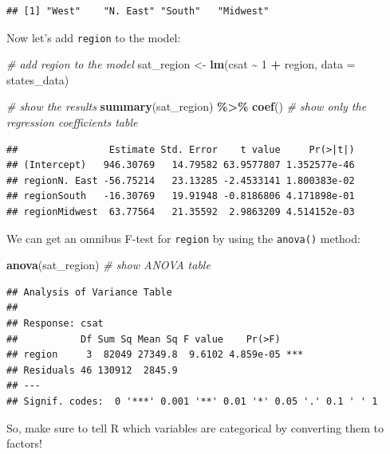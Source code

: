 \documentclass[
]{book}
\newenvironment{Shaded}{\begin{snugshade}}{\end{snugshade}}
\newcommand{\CommentTok}[1]{\textcolor[rgb]{0.56,0.35,0.01}{\textit{#1}}}
\newcommand{\DataTypeTok}[1]{\textcolor[rgb]{0.13,0.29,0.53}{#1}}
\newcommand{\DecValTok}[1]{\textcolor[rgb]{0.00,0.00,0.81}{#1}}
\newcommand{\KeywordTok}[1]{\textcolor[rgb]{0.13,0.29,0.53}{\textbf{#1}}}
\newcommand{\NormalTok}[1]{#1}
\newcommand{\OperatorTok}[1]{\textcolor[rgb]{0.81,0.36,0.00}{\textbf{#1}}}
\newcommand{\StringTok}[1]{\textcolor[rgb]{0.31,0.60,0.02}{#1}}
\begin{document}
\begin{verbatim}
## [1] "West"    "N. East" "South"   "Midwest"
\end{verbatim}

Now let's add \texttt{region} to the model:

\begin{Shaded}
\begin{Highlighting}[]
  \CommentTok{\# add region to the model}
\NormalTok{  sat\_region \textless{}{-}}\StringTok{ }\KeywordTok{lm}\NormalTok{(csat }\OperatorTok{\textasciitilde{}}\StringTok{ }\DecValTok{1} \OperatorTok{+}\StringTok{ }\NormalTok{region, }\DataTypeTok{data =}\NormalTok{ states\_data) }

  \CommentTok{\# show the results}
  \KeywordTok{summary}\NormalTok{(sat\_region) }\OperatorTok{\%\textgreater{}\%}\StringTok{ }\KeywordTok{coef}\NormalTok{() }\CommentTok{\# show only the regression coefficients table}
\end{Highlighting}
\end{Shaded}

\begin{verbatim}
##                Estimate Std. Error    t value     Pr(>|t|)
## (Intercept)   946.30769   14.79582 63.9577807 1.352577e-46
## regionN. East -56.75214   23.13285 -2.4533141 1.800383e-02
## regionSouth   -16.30769   19.91948 -0.8186806 4.171898e-01
## regionMidwest  63.77564   21.35592  2.9863209 4.514152e-03
\end{verbatim}

We can get an omnibus F-test for \texttt{region} by using the \texttt{anova()} method:

\begin{Shaded}
\begin{Highlighting}[]
  \KeywordTok{anova}\NormalTok{(sat\_region) }\CommentTok{\# show ANOVA table}
\end{Highlighting}
\end{Shaded}

\begin{verbatim}
## Analysis of Variance Table
## 
## Response: csat
##           Df Sum Sq Mean Sq F value    Pr(>F)    
## region     3  82049 27349.8  9.6102 4.859e-05 ***
## Residuals 46 130912  2845.9                      
## ---
## Signif. codes:  0 '***' 0.001 '**' 0.01 '*' 0.05 '.' 0.1 ' ' 1
\end{verbatim}

So, make sure to tell R which variables are categorical by converting them to factors!
\end{document}
